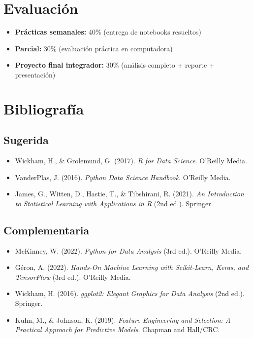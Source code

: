\documentclass[a4paper,11pt]{article}
\begin{document}
\section*{Evaluación}

\begin{itemize}[leftmargin=*]
    \item \textbf{Prácticas semanales:} 40\% (entrega de notebooks resueltos)
    \item \textbf{Parcial:} 30\% (evaluación práctica en computadora)
    \item \textbf{Proyecto final integrador:} 30\% (análisis completo + reporte + presentación)
\end{itemize}

\section*{Bibliografía}

\subsection*{Sugerida}
\begin{itemize}[leftmargin=*]
    \item Wickham, H., \& Grolemund, G. (2017). \textit{R for Data Science}. O'Reilly Media.
    \item VanderPlas, J. (2016). \textit{Python Data Science Handbook}. O'Reilly Media.
    \item James, G., Witten, D., Hastie, T., \& Tibshirani, R. (2021). \textit{An Introduction to Statistical Learning with Applications in R} (2nd ed.). Springer.
\end{itemize}

\subsection*{Complementaria}
\begin{itemize}[leftmargin=*]
    \item McKinney, W. (2022). \textit{Python for Data Analysis} (3rd ed.). O'Reilly Media.
    \item Géron, A. (2022). \textit{Hands-On Machine Learning with Scikit-Learn, Keras, and TensorFlow} (3rd ed.). O'Reilly Media.
    \item Wickham, H. (2016). \textit{ggplot2: Elegant Graphics for Data Analysis} (2nd ed.). Springer.
    \item Kuhn, M., \& Johnson, K. (2019). \textit{Feature Engineering and Selection: A Practical Approach for Predictive Models}. Chapman and Hall/CRC.
\end{itemize}
\end{document}
